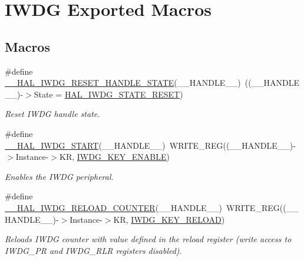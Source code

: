 \hypertarget{group___i_w_d_g___exported___macros}{\section{I\-W\-D\-G Exported Macros}
\label{group___i_w_d_g___exported___macros}
}
\subsection*{Macros}
\begin{DoxyCompactItemize}
\item 
\#define \hyperlink{group___i_w_d_g___exported___macros_ga9990235f5c32f26ed6455a30bc14ee65}{\-\_\-\-\_\-\-H\-A\-L\-\_\-\-I\-W\-D\-G\-\_\-\-R\-E\-S\-E\-T\-\_\-\-H\-A\-N\-D\-L\-E\-\_\-\-S\-T\-A\-T\-E}(\-\_\-\-\_\-\-H\-A\-N\-D\-L\-E\-\_\-\-\_\-)~((\-\_\-\-\_\-\-H\-A\-N\-D\-L\-E\-\_\-\-\_\-)-\/$>$State = \hyperlink{group___i_w_d_g___exported___types_gga61699dc6f24a3edecddd16018560d0e5afc0696c27fdaa4f7dbe7f08a9b5d6030}{H\-A\-L\-\_\-\-I\-W\-D\-G\-\_\-\-S\-T\-A\-T\-E\-\_\-\-R\-E\-S\-E\-T})
\begin{DoxyCompactList}\small\item\em Reset I\-W\-D\-G handle state. \end{DoxyCompactList}\item 
\#define \hyperlink{group___i_w_d_g___exported___macros_ga5914aff5b85e3151bb75377a32d83d6a}{\-\_\-\-\_\-\-H\-A\-L\-\_\-\-I\-W\-D\-G\-\_\-\-S\-T\-A\-R\-T}(\-\_\-\-\_\-\-H\-A\-N\-D\-L\-E\-\_\-\-\_\-)~W\-R\-I\-T\-E\-\_\-\-R\-E\-G((\-\_\-\-\_\-\-H\-A\-N\-D\-L\-E\-\_\-\-\_\-)-\/$>$Instance-\/$>$K\-R, \hyperlink{group___i_w_d_g___private___defines_ga493295d56bb62752982234755612386f}{I\-W\-D\-G\-\_\-\-K\-E\-Y\-\_\-\-E\-N\-A\-B\-L\-E})
\begin{DoxyCompactList}\small\item\em Enables the I\-W\-D\-G peripheral. \end{DoxyCompactList}\item 
\#define \hyperlink{group___i_w_d_g___exported___macros_gac0eaf381e60a654d6b51c43f645e088f}{\-\_\-\-\_\-\-H\-A\-L\-\_\-\-I\-W\-D\-G\-\_\-\-R\-E\-L\-O\-A\-D\-\_\-\-C\-O\-U\-N\-T\-E\-R}(\-\_\-\-\_\-\-H\-A\-N\-D\-L\-E\-\_\-\-\_\-)~W\-R\-I\-T\-E\-\_\-\-R\-E\-G((\-\_\-\-\_\-\-H\-A\-N\-D\-L\-E\-\_\-\-\_\-)-\/$>$Instance-\/$>$K\-R, \hyperlink{group___i_w_d_g___private___defines_ga33abf7b7c76dfda6b6380448a1d28966}{I\-W\-D\-G\-\_\-\-K\-E\-Y\-\_\-\-R\-E\-L\-O\-A\-D})
\begin{DoxyCompactList}\small\item\em Reloads I\-W\-D\-G counter with value defined in the reload register (write access to I\-W\-D\-G\-\_\-\-P\-R and I\-W\-D\-G\-\_\-\-R\-L\-R registers disabled). \end{DoxyCompactList}\item 

\end{DoxyCompactItemize}
